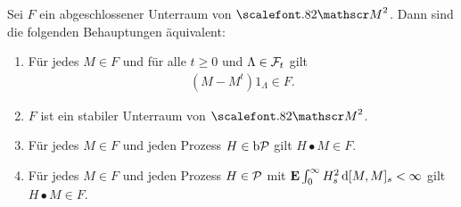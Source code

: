 \begin{theorem}
\label{prop:5.1}
Sei $F$ ein abgeschlossener Unterraum von $\MM^2$. Dann sind die folgenden
Behauptungen äquivalent:
\begin{enumerate}
  \item Für jedes $M\in F$ und für alle $t \ge 0$ und $\Lambda\in\mathcal{F}_t$ gilt
  \begin{align*}
  (M-M^t) 1_\Lambda \in F.
  \end{align*}
  \item $F$ ist ein stabiler Unterraum von $\MM^2$.
  \item Für jedes $M\in F$ und jeden Prozess $H\in\mathrm{b}\mathcal{P}$ gilt $ H\bullet M \in
  F$.
  \item Für jedes $M\in F$ und jeden Prozess $H\in\mathcal{P}$ mit
    $\mathbf{E}\int_0^\infty H^2_s\, \mathrm{d}[M,M]_s < \infty$ gilt $ H\bullet M \in
    F$.\fish
\end{enumerate}
\end{theorem}
